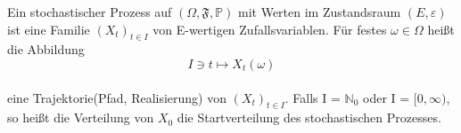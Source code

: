 Ein stochastischer Prozess auf $(\Omega, \mathfrak{F}, \mathbb{P})$ mit Werten im Zustandsraum $(E, \varepsilon)$ ist eine Familie $(X_{t})_{t\in I}$ von E-wertigen Zufallsvariablen. Für festes $\omega \in \Omega$ heißt die Abbildung
\\
\begin{equation*}
I \ni t \mapsto X_{t}(\omega)
\end{equation*}
\\
eine Trajektorie(Pfad, Realisierung) von $(X_{t})_{t\in I}$. Falls I = $\mathbb{N}_{0}$ oder I = $[0,\infty)$, so heißt die Verteilung von $X_{0}$ die Startverteilung des stochastischen Prozesses.